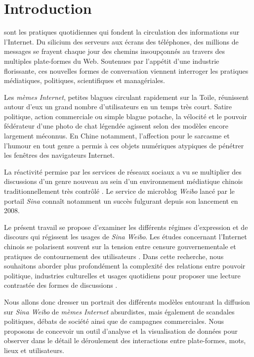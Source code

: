 \chapter*{Introduction}


 sont les pratiques quotidiennes qui fondent la circulation des informations sur l'Internet. Du silicium des serveurs aux écrans des téléphones, des millions de messages se frayent chaque jour des chemins insoupçonnés au travers des multiples plate-formes du Web. Soutenues par l'appétit d'une industrie florissante, ces nouvelles formes de conversation viennent interroger les pratiques médiatiques, politiques, scientifiques et managériales. 

Les \textit{mèmes Internet}, petites blagues circulant rapidement sur la Toile, réunissent autour d'eux un grand nombre d'utilisateurs en un temps très court. Satire politique, action commerciale ou simple blague potache, la vélocité et le pouvoir fédérateur d'une photo de chat légendée agissent selon des modèles encore largement méconnus. En Chine notamment, l'affection pour le sarcasme et l'humour en tout genre a permis à ces objets numériques atypiques de pénétrer les fenêtres des navigateurs Internet.

La réactivité permise par les services de réseaux sociaux a vu se multiplier des discussions d'un genre nouveau au sein d'un environnement médiatique chinois traditionnellement très contrôlé \citep{MacKinnon2009, Douzet2007, Yang2008}. Le service de microblog \textit{Weibo} lancé par le portail \textit{Sina} connaît notamment un succès fulgurant depuis son lancement en 2008.

Le présent travail se propose d'examiner les différents régimes d'expression et de discours qui régissent les usages de \textit{Sina Weibo}. Les études concernant l'Internet chinois se polarisent souvent sur la tension entre censure gouvernementale \citep{Ng2013a} et pratiques de contournement des utilisateurs \citep{Yang2014}. Dans cette recherche, nous souhaitons aborder plus profondément la complexité des relations entre pouvoir politique, industries culturelles et usages quotidiens pour proposer une lecture contrastée des formes de discussions \citep{Fernandez2010}.

Nous allons donc dresser un portrait des différents modèles entourant la  diffusion sur \textit{Sina Weibo} de \textit{mèmes Internet} absurdistes, mais également de scandales politiques, débats de société ainsi que de campagnes commerciales. Nous proposons de concevoir un outil d'analyse et la visualisation de données pour observer dans le détail le déroulement des interactions entre plate-formes, mots, lieux et utilisateurs.


